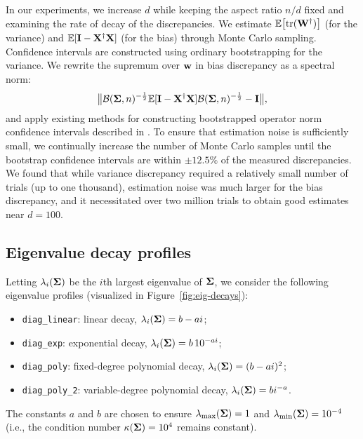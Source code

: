 In our experiments, we increase $d$ while keeping the aspect ratio $n/d$
fixed and examining the rate of decay of the discrepancies.
We estimate $\mathbb E\big[\mathrm{tr}(\mathbf W^\dagger)\big]$ (for the variance) and
$\mathbb E[\mathbf I-\mathbf X^\dagger\mathbf X]$ (for the bias) through Monte Carlo sampling.
Confidence intervals are constructed using ordinary bootstrapping for
the variance. We rewrite the supremum over $\mathbf w$ in bias discrepancy as
a spectral norm: 
\[\big\|\mathcal{B}(\mathbf{\Sigma},n)^{-\frac12}\mathbb E[\mathbf I-\mathbf X^\dagger\mathbf X]\mathcal{B}(\mathbf{\Sigma},n)^{-\frac12} -
  \mathbf I\big\|,\]
and apply existing methods for constructing bootstrapped operator
norm confidence intervals described in \cite{lopes2019bootstrapping}.  To
ensure that estimation noise is sufficiently small, we continually increase the
number of Monte Carlo samples until the bootstrap confidence intervals are
within $\pm 12.5\%$ of the measured discrepancies.  We found that while
variance discrepancy required a relatively small number of trials (up
to one thousand), estimation noise was much larger for the bias
discrepancy, and it necessitated over two million trials to obtain
good estimates near $d=100$. 

\subsection{Eigenvalue decay profiles}
\label{sec:eig-decay-details}

Letting $\lambda_i(\mathbf{\Sigma})$ be the $i$th largest eigenvalue of
$\mathbf{\Sigma}$, we consider the
following eigenvalue profiles (visualized in Figure~\ref{fig:eig-decays}):
\begin{itemize}
  \item \texttt{diag\_linear}: linear decay, $\lambda_i(\mathbf{\Sigma})= b-a i$;
  \item \texttt{diag\_exp}: exponential decay, $\lambda_i(\mathbf{\Sigma}) = b\,10^{- a i} $;
  \item \texttt{diag\_poly}: fixed-degree polynomial decay, $\lambda_i(\mathbf{\Sigma}) = (b-a i)^2$;
  \item \texttt{diag\_poly\_2}: variable-degree polynomial decay, $\lambda_i(\mathbf{\Sigma}) = b i^{-a}$.
\end{itemize}
The constants $a$ and $b$ are chosen to ensure $\lambda_{\text{max}}(\mathbf{\Sigma}) = 1$ and
$\lambda_{\text{min}}(\mathbf{\Sigma}) = 10^{-4}$ (i.e., the condition number
$\kappa(\mathbf{\Sigma}) = 10^{4}$ remains constant).
